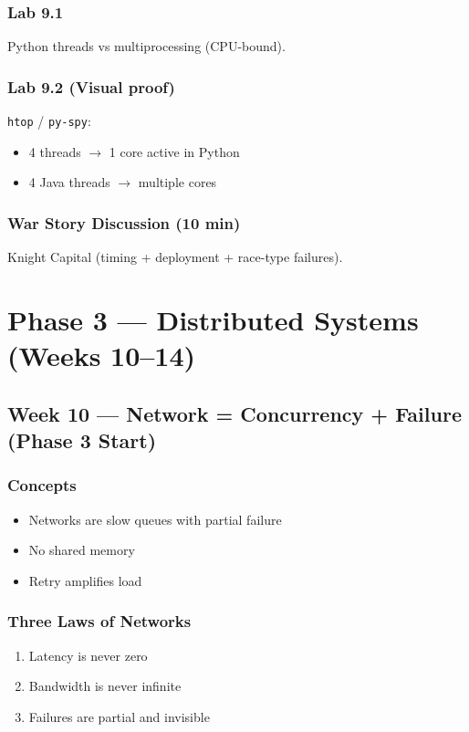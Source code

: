 \documentclass[11pt,a4paper]{article}
\begin{document}
	\subsubsection*{Lab 9.1}
	Python threads vs multiprocessing (CPU-bound).
	
	\subsubsection*{Lab 9.2 (Visual proof)}
	\texttt{htop} / \texttt{py-spy}:
	\begin{itemize}[leftmargin=*]
		\item 4 threads $\rightarrow$ 1 core active in Python
		\item 4 Java threads $\rightarrow$ multiple cores
	\end{itemize}
	
	\subsubsection*{War Story Discussion (10 min)}
	Knight Capital (timing + deployment + race-type failures).
	
	\section*{Phase 3 --- Distributed Systems (Weeks 10--14)}
	
	\subsection*{Week 10 --- Network = Concurrency + Failure (Phase 3 Start)}
	
	\subsubsection*{Concepts}
	\begin{itemize}[leftmargin=*]
		\item Networks are slow queues with partial failure
		\item No shared memory
		\item Retry amplifies load
	\end{itemize}
	
	\subsubsection*{Three Laws of Networks}
	\begin{enumerate}[leftmargin=*]
		\item Latency is never zero
		\item Bandwidth is never infinite
		\item Failures are partial and invisible
	\end{enumerate}
	
\end{document}
